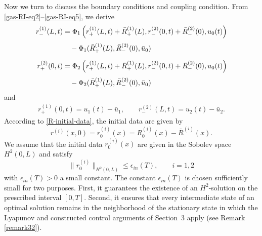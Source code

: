 \documentclass[12pt]{article}
\numberwithin{equation}{section}
\begin{document}
Now we turn to discuss the boundary conditions and coupling condition. From \eqref{gas-RI-eq2}--\eqref{gas-RI-eq5}, we derive
\begin{align}
    r_-^{(1)}(L,t)&=\Phi_1\left({r}_+^{(1)}(L,t)+\bar{R}_+^{(1)}(L),{r}_-^{(2)}(0,t)+\bar{R}_-^{(2)}(0),u_0(t)\right)\notag \\[1mm]
    &\quad -\Phi_1(\bar{R}_+^{(1)}(L),\bar{R}_-^{(2)}(0),\bar{u}_0) \label{eq1.11}\\[2mm]
    r_+^{(2)}(0,t)&=\Phi_2\left({r}_+^{(1)}(L,t)+\bar{R}_+^{(1)}(L),{r}_-^{(2)}(0,t)+\bar{R}_-^{(2)}(0),u_0(t)\right)\notag \\[1mm]
    &\quad -\Phi_2(\bar{R}_+^{(1)}(L),\bar{R}_-^{(2)}(0),\bar{u}_0)  \label{eq1.12}
\end{align}
and
\begin{align}\label{eq1.13}
    r_+^{(1)}(0,t)=u_1(t)-\bar{u}_1,\qquad
    r_-^{(2)}(L,t)=u_2(t)-\bar{u}_2.
\end{align}
According to \eqref{R-initial-data}, the initial data are given by 
\begin{equation}\label{deviation-initial-data}
    r^{(i)}(x,0)=r_{0}^{(i)}(x)=R_{0}^{(i)}(x)-\bar{R}^{(i)}(x).
\end{equation}
We assume that the initial data $r_{0}^{(i)}(x)$ are given in the Sobolev space $H^2(0,L)$ and satisfy
\begin{equation}\label{initial data}
\|r_{0}^{(i)}\|_{H^2(0,L)}\leq \epsilon_{in}(T),\qquad i=1,2
\end{equation}
with $\epsilon_{in}(T)>0$ a small constant. The constant $\epsilon_{in}(T)$ is chosen sufficiently small for two
purposes. First, it guarantees the existence of an $H^2$-solution on
the prescribed interval $[0,T]$. Second, it ensures that every
intermediate state of an optimal solution remains in the 
neighborhood of the stationary state in which the Lyapunov and
constructed control arguments of Section~3 apply (see Remark \ref{remark32}).

\end{document}
